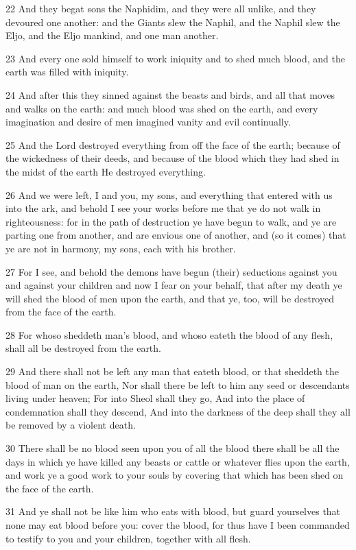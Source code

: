 \par 22 And they begat sons the Naphidim, and they were all unlike, and they devoured one another: and the Giants slew the Naphil, and the Naphil slew the Eljo, and the Eljo mankind, and one man another.
\par 23 And every one sold himself to work iniquity and to shed much blood, and the earth was filled with iniquity.
\par 24 And after this they sinned against the beasts and birds, and all that moves and walks on the earth: and much blood was shed on the earth, and every imagination and desire of men imagined vanity and evil continually.
\par 25 And the Lord destroyed everything from off the face of the earth; because of the wickedness of their deeds, and because of the blood which they had shed in the midst of the earth He destroyed everything.
\par 26 And we were left, I and you, my sons, and everything that entered with us into the ark, and behold I see your works before me that ye do not walk in righteousness: for in the path of destruction ye have begun to walk, and ye are parting one from another, and are envious one of another, and (so it comes) that ye are not in harmony, my sons, each with his brother.
\par 27 For I see, and behold the demons have begun (their) seductions against you and against your children and now I fear on your behalf, that after my death ye will shed the blood of men upon the earth, and that ye, too, will be destroyed from the face of the earth.
\par 28 For whoso sheddeth man's blood, and whoso eateth the blood of any flesh, shall all be destroyed from the earth.
\par 29 And there shall not be left any man that eateth blood, or that sheddeth the blood of man on the earth, Nor shall there be left to him any seed or descendants living under heaven; For into Sheol shall they go, And into the place of condemnation shall they descend, And into the darkness of the deep shall they all be removed by a violent death.
\par 30 There shall be no blood seen upon you of all the blood there shall be all the days in which ye have killed any beasts or cattle or whatever flies upon the earth, and work ye a good work to your souls by covering that which has been shed on the face of the earth.
\par 31 And ye shall not be like him who eats with blood, but guard yourselves that none may eat blood before you: cover the blood, for thus have I been commanded to testify to you and your children, together with all flesh.
